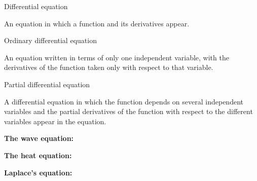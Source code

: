 \EMhold


\begin{EMdefinition}{Differential equation}

An equation in which a function and its derivatives appear.

\end{EMdefinition}

\begin{EMdefinition}{Ordinary differential equation}

An equation written in terms of only one independent variable, with the derivatives of the function taken only with respect to that variable.

\end{EMdefinition}

\begin{EMdefinition}{Partial differential equation}

A differential equation in which the function depends on several independent variables and the partial derivatives of the function with respect to the different variables appear in the equation.

\end{EMdefinition}

\begin{EMunit}

\textbf{The wave equation:}

\textbf{The heat equation:}

\end{EMunit}

\textbf{Laplace's equation:}

